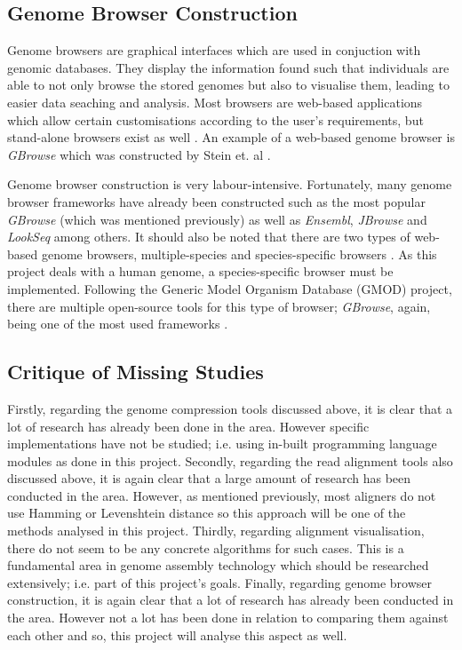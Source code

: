 \documentclass{csfyp}
\begin{document}
\subsection{Genome Browser Construction}\vspace{-2ex}
Genome browsers are graphical interfaces which are used in conjuction with genomic databases.  They display the information found such that individuals are able to not only browse the stored genomes but also to visualise them, leading to easier data seaching and analysis.  Most browsers are web-based applications which allow certain customisations according to the user's requirements, but stand-alone browsers exist as well \cite{webbrowser, genericbrowser}.  An example of a web-based genome browser is {\textit{GBrowse}} which was constructed by Stein et. al \cite{genericbrowser}. 
 
Genome browser construction is very labour-intensive.  Fortunately, many genome browser frameworks have already been constructed such as the most popular {\textit{GBrowse}} (which was mentioned previously) as well as {\textit{Ensembl}}, {\textit{JBrowse}} and {\textit{LookSeq}} among others.  It should also be noted that there are two types of web-based genome browsers, multiple-species and species-specific browsers \cite{webbrowser}.  As this project deals with a human genome, a species-specific browser must be implemented.  Following the Generic Model Organism Database (GMOD) project, there are multiple open-source tools for this type of browser; {\textit{GBrowse}}, again, being one of the most used frameworks \cite{webbrowser}.              

\subsection{Critique of Missing Studies}\vspace{-2ex}
Firstly, regarding the genome compression tools discussed above, it is clear that a lot of research has already been done in the area.  However specific implementations have not be studied; i.e. using in-built programming language modules as done in this project.  Secondly, regarding the read alignment tools also discussed above, it is again clear that a large amount of research has been conducted in the area.  However, as mentioned previously, most aligners do not use Hamming or Levenshtein distance so this approach will be one of the methods analysed in this project.  Thirdly, regarding alignment visualisation, there do not seem to be any concrete algorithms for such cases.  This is a fundamental area in genome assembly technology which should be researched extensively; i.e. part of this project's goals.  Finally, regarding genome browser construction, it is again clear that a lot of research has already been conducted in the area.  However not a lot has been done in relation to comparing them against each other and so, this project will analyse this aspect as well.      
\end{document}
